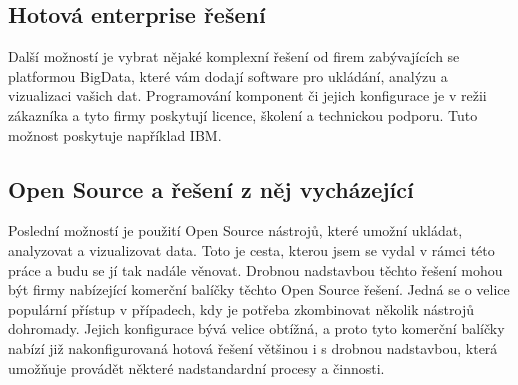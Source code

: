 \subsection{Hotová enterprise řešení}
Další možností je vybrat nějaké komplexní řešení od firem zabývajících se platformou BigData, které vám dodají software pro ukládání, analýzu a vizualizaci vašich dat. Programování komponent či jejich konfigurace je v režii zákazníka a tyto firmy poskytují licence, školení a technickou podporu. Tuto možnost poskytuje například IBM.

\subsection{Open Source a řešení z něj vycházející} 
Poslední možností je použití Open Source nástrojů, které umožní ukládat, analyzovat a vizualizovat data. Toto je cesta, kterou jsem se vydal v rámci této práce a budu se jí tak nadále věnovat. Drobnou nadstavbou těchto řešení mohou být firmy nabízející komerční balíčky těchto Open Source řešení. Jedná se o velice populární přístup v případech, kdy je potřeba zkombinovat několik nástrojů dohromady. Jejich konfigurace bývá velice obtížná, a proto tyto komerční balíčky nabízí již nakonfigurovaná hotová řešení většinou i s drobnou nadstavbou, která umožňuje provádět některé nadstandardní procesy a činnosti. 
